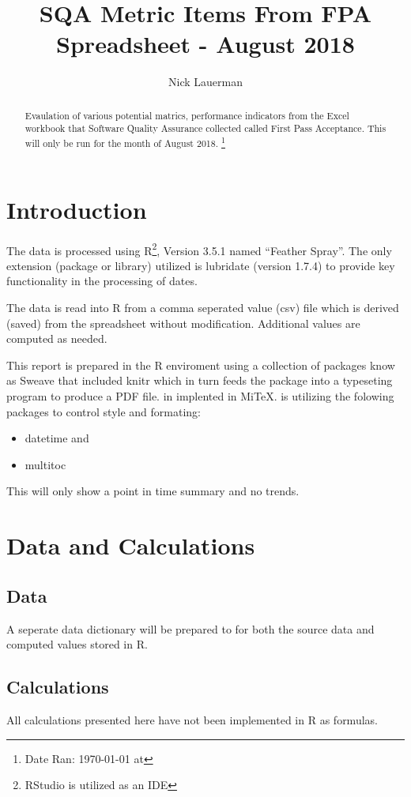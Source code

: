 \documentclass{article}
\title{SQA Metric Items From FPA Spreadsheet - August 2018}
\author{Nick Lauerman}
\date{}
\begin{document}

\maketitle

\begin{abstract}
Evaulation of various potential matrics, performance indicators from the Excel
workbook that Software Quality Assurance collected called First Pass
Acceptance. This will only be run for the month of August 2018.
\footnote{Date Ran: \today{} at \currenttime}
\end{abstract}

\tableofcontents

\section{Introduction}
The data is processed using R\footnote{RStudio is utilized as an IDE}, Version
3.5.1 named ``Feather Spray''. The only extension (package or library) utilized is
lubridate (version 1.7.4) to provide key functionality in the processing of dates.

The data is read into R from a comma seperated value (csv) file which is derived (saved)
from the spreadsheet without modification. Additional values are computed as needed.

This report is prepared in the R enviroment using a collection of packages know as
Sweave that included knitr which in turn feeds the package into \LaTeXe{} a typeseting
program to produce a PDF file. \LaTeXe{} in implented in Mi\TeX. \LaTeXe{} is utilizing
the folowing packages to control style and formating:
\begin{itemize}
\item datetime and
\item multitoc
\end{itemize}

This will only show a point in time summary and no trends.

\section{Data and Calculations}
\subsection{Data}
A seperate data dictionary will be prepared to for both the source data
and computed values stored in R.

\subsection{Calculations}
All calculations presented here have not been implemented in R as formulas.
\end{document}
